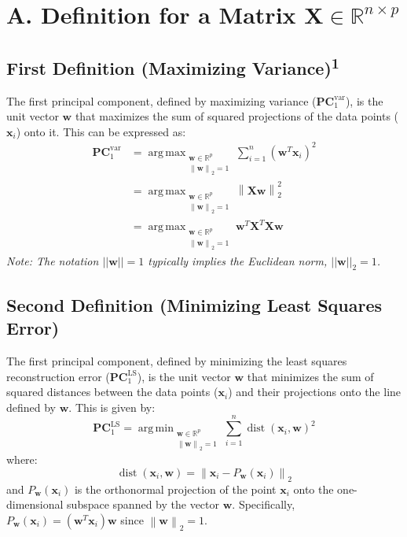 \documentclass{article}
\renewcommand{\vec}[1]{\mathbf{#1}} %
\newcommand{\mat}[1]{\mathbf{#1}} %
\newcommand{\R}{\mathbb{R}} %
\DeclareMathOperator*{\argmax}{arg\,max} %
\DeclareMathOperator*{\argmin}{arg\,min} %
\newcommand{\norm}[1]{\left\lVert#1\right\rVert} %
\newcommand{\dist}{\operatorname{dist}} %
\begin{document}
\section*{A. Definition for a Matrix $\mat{X} \in \R^{n \times p}$}

\subsection*{First Definition (Maximizing Variance)\textsuperscript{1}}

The first principal component, defined by maximizing variance ($\vec{PC}_1^{\text{var}}$), is the unit vector $\vec{w}$ that maximizes the sum of squared projections of the data points ($\vec{x}_i$) onto it. This can be expressed as:
\begin{align*}
\vec{PC}_1^{\text{var}} &= \argmax_{\substack{\vec{w} \in \R^p \\ \norm{\vec{w}}_2=1}} \sum_{i=1}^n (\vec{w}^T \vec{x}_i)^2 \\
&= \argmax_{\substack{\vec{w} \in \R^p \\ \norm{\vec{w}}_2=1}} \norm{\mat{X}\vec{w}}_2^2 \\
&= \argmax_{\substack{\vec{w} \in \R^p \\ \norm{\vec{w}}_2=1}} \vec{w}^T \mat{X}^T \mat{X} \vec{w}
\end{align*}
\textit{Note: The notation $||\vec{w}||=1$ typically implies the Euclidean norm, $||\vec{w}||_2=1$.}

\subsection*{Second Definition (Minimizing Least Squares Error)}

The first principal component, defined by minimizing the least squares reconstruction error ($\vec{PC}_1^{\text{LS}}$), is the unit vector $\vec{w}$ that minimizes the sum of squared distances between the data points ($\vec{x}_i$) and their projections onto the line defined by $\vec{w}$. This is given by:
\[
\vec{PC}_1^{\text{LS}} = \argmin_{\substack{\vec{w} \in \R^p \\ \norm{\vec{w}}_2=1}} \sum_{i=1}^n \dist(\vec{x}_i, \vec{w})^2
\]
where:
\[
\dist(\vec{x}_i, \vec{w}) = \norm{\vec{x}_i - P_{\vec{w}}(\vec{x}_i)}_2
\]
and $P_{\vec{w}}(\vec{x}_i)$ is the orthonormal projection of the point $\vec{x}_i$ onto the one-dimensional subspace spanned by the vector $\vec{w}$. Specifically, $P_{\vec{w}}(\vec{x}_i) = (\vec{w}^T \vec{x}_i)\vec{w}$ since $\norm{\vec{w}}_2=1$.
\end{document}

